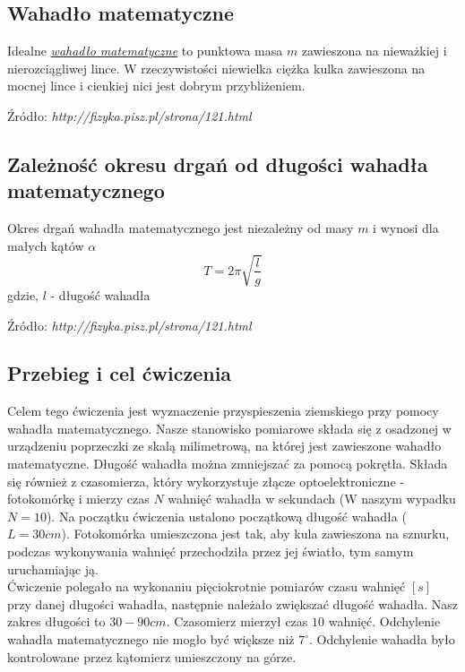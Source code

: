 \documentclass{article}
\begin{document}
\begin{small}
\subsection*{Wahadło matematyczne} 
Idealne \textit{\underline{wahadło matematyczne}} to punktowa masa $m$ zawieszona na nieważkiej i nierozciągliwej lince. W rzeczywistości niewielka ciężka kulka zawieszona na mocnej lince i cienkiej nici jest dobrym przybliżeniem. 
\begin{flushright}
\begin{scriptsize}
Źródło: \textit{http://fizyka.pisz.pl/strona/121.html}
\end{scriptsize}
\end{flushright}

\subsection*{Zależność okresu drgań od długości wahadła matematycznego} 
Okres drgań wahadła matematycznego jest niezależny od masy $m$ i wynosi dla małych kątów $\alpha$
$$T=2\pi \sqrt{\frac{l}{g}}$$
gdzie, $l$ - długość wahadła
\begin{flushright}
\begin{scriptsize}
Źródło: \textit{http://fizyka.pisz.pl/strona/121.html}
\end{scriptsize}
\end{flushright}


\newpage
\subsection*{Przebieg i cel ćwiczenia}
	Celem tego ćwiczenia jest wyznaczenie przyspieszenia ziemskiego przy pomocy wahadła matematycznego. 
	Nasze stanowisko pomiarowe składa się z osadzonej w urządzeniu poprzeczki ze skalą milimetrową, na której jest zawieszone wahadło matematyczne. Długość wahadła można zmniejszać za pomocą pokrętła. Składa się również z czasomierza, który wykorzystuje złącze optoelektroniczne - fotokomórkę i mierzy czas $N$ wahnięć wahadła w sekundach (W naszym wypadku $N=10$). Na początku ćwiczenia ustalono początkową długość wahadła ($L=30 cm$). Fotokomórka umieszczona jest tak, aby kula zawieszona na sznurku, podczas wykonywania wahnięć przechodziła przez jej światło, tym samym uruchamiając ją. \\
	Ćwiczenie polegało na wykonaniu pięciokrotnie pomiarów czasu wahnięć $[s]$ przy danej długości wahadła, następnie należało zwiększać długość wahadła. Nasz zakres długości to $30-90 cm$. Czasomierz mierzył czas $10$ wahnięć. Odchylenie wahadła matematycznego nie mogło być większe niż $7^{\circ}$. Odchylenie wahadła było kontrolowane przez kątomierz umieszczony na górze.

\end{small}
\end{document}
